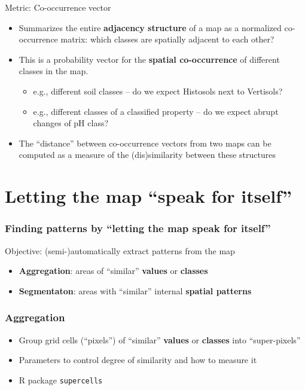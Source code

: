 \documentclass[aspectratio=169, 10pt]{beamer}
\begin{document}
\begin{frame}{Metric: Co-occurrence vector}
  \begin{itemize}
  \item 
    Summarizes the entire \textbf{adjacency structure} of a map as a    normalized co-occurrence matrix: which classes are spatially adjacent to each other?
  \item
    This is a probability vector for the \textbf{spatial co-occurrence} of  different    classes in the map.
    \begin{itemize}
    \item e.g., different soil classes -- do we expect Histosols next to Vertisols?
    \item e.g., different classes of a classified property -- do we expect abrupt changes of pH class?
    \end{itemize}
    \item
    The ``distance'' between co-occurrence vectors from two maps can be computed   as a measure of the (dis)similarity between these structures
  \end{itemize}
\end{frame}

\section{Letting the map ``speak for itself''}

\begin{frame}
  \frametitle{Finding patterns by ``letting the map speak for itself''}
Objective: (semi-)automatically extract patterns from the map
    \begin{itemize}
    \item \textbf{Aggregation}: areas of ``similar'' \textbf{values} or \textbf{classes}
    \item \textbf{Segmentaton}: areas with ``similar'' internal \textbf{spatial patterns}
    \end{itemize}
\end{frame}

\begin{frame}
  \frametitle{Aggregation}
  \begin{itemize}
  \item Group grid cells (``pixels'')  of ``similar'' \textbf{values} or \textbf{classes} into ``super-pixels''
\item Parameters to control degree of similarity and how to measure it
  \item R package \texttt{supercells}
  \end{itemize}
\end{frame}
\end{document}
